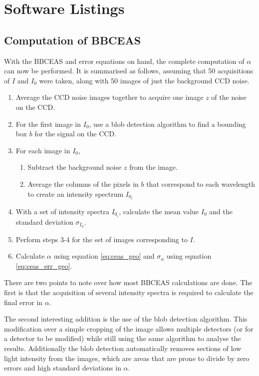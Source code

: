 \chapter{Software Listings}

\section{Computation of BBCEAS}\label{sec:comp_bbceas}


With the \ac{BBCEAS} and error equations on hand, the complete computation of
$\alpha$ can now be performed. It is summarised as follows, assuming that 50
acquisitions of $I$ and $I_0$ were taken, along with 50 images of just the
background \ac{CCD} noise.

\begin{enumerate}
  \item Average the \ac{CCD} noise images together to acquire one image $z$
        of the noise on the \ac{CCD}.
  \item For the first image in $I_0$, use a blob detection algorithm to find
        a bounding box $b$ for the signal on the \ac{CCD}.
  \item For each image in $I_0$,
    \begin{enumerate}
      \item Subtract the background noise $z$ from the image.
      \item Average the columns of the pixels in $b$ that correspond to each
        wavelength to create an intensity spectrum $I_{0_{i}}$
    \end{enumerate}
  \item With a set of intensity spectra $I_{0_i}$, calculate the mean value
        $I_0$ and the standard deviation $\sigma_{I_0}$.
  \item Perform steps 3-4 for the set of images corresponding to $I$.
  \item Calculate $\alpha$ using equation \eqref{eq:ceas_geo} and
    $\sigma_\alpha$ using equation \eqref{eq:ceas_err_geo}.
\end{enumerate}

There are two points to note over how most \ac{BBCEAS} calculations are done.
The first is that the acquisition of several intensity spectra is required to
calculate the final error in $\alpha$.

The second interesting addition is the use of the blob detection algorithm.
This modification over a simple cropping of the image allows multiple
detectors (or for a detector to be modified) while still using the same
algorithm to analyse the results. Additionally the blob detection
automatically removes sections of low light intensity from the images, which
are areas that are prone to divide by zero errors and high standard deviations
in $\alpha$.


